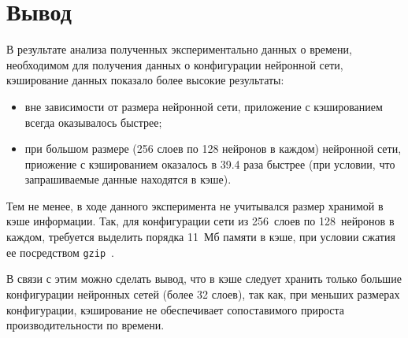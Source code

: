 \section*{Вывод}

В результате анализа полученных экспериментально данных о времени, необходимом для получения данных о конфигурации нейронной сети, кэширование данных показало более высокие результаты:
\begin{itemize}
    \item вне зависимости от размера нейронной сети, приложение с кэшированием всегда оказывалось быстрее;
    \item при большом размере (256 слоев по 128 нейронов в каждом) нейронной сети, приожение с кэшированием оказалось в 39.4 раза быстрее (при условии, что запрашиваемые данные находятся в кэше).
\end{itemize}

Тем не менее, в ходе данного эксперимента не учитывался размер хранимой в кэше информации. Так, для конфигурации сети из 256~слоев по 128~нейронов в каждом, требуется выделить порядка 11~Мб памяти в кэше, при условии сжатия ее посредством \texttt{gzip}~\cite{gzip}.

В связи с этим можно сделать вывод, что в кэше следует хранить только большие конфигурации нейронных сетей (более 32 слоев), так как, при меньших размерах конфигурации, кэширование не обеспечивает сопоставимого прироста производительности по времени.